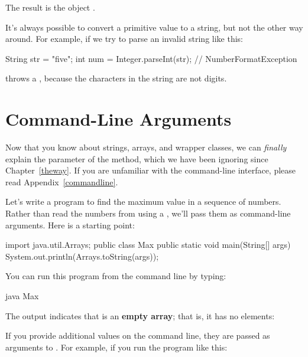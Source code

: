 The result is the  object .


It's always possible to convert a primitive value to a string, but not the other way around.  For example, if we try to parse an invalid string like this:

\begin{code}
String str = "five";
int num = Integer.parseInt(str);  // NumberFormatException
\end{code}

 throws a , because the characters in the string  are not digits.


\section{Command-Line Arguments}


Now that you know about strings, arrays, and wrapper classes, we can {\em finally} explain the  parameter of the  method, which we have been ignoring since Chapter~\ref{theway}.
If you are unfamiliar with the command-line interface, please read Appendix~\ref{commandline}.

Let's write a program to find the maximum value in a sequence of numbers.
Rather than read the numbers from  using a , we'll pass them as command-line arguments.
Here is a starting point:

\begin{code}
import java.util.Arrays;
public class Max {
    public static void main(String[] args) {
        System.out.println(Arrays.toString(args));
    }
}
\end{code}

You can run this program from the command line by typing:

\begin{stdout}
java Max
\end{stdout}


The output indicates that  is an {\bf empty array}; that is, it has no elements:

\begin{stdout}
[]
\end{stdout}

If you provide additional values on the command line, they are passed as arguments to .
For example, if you run the program like this:

